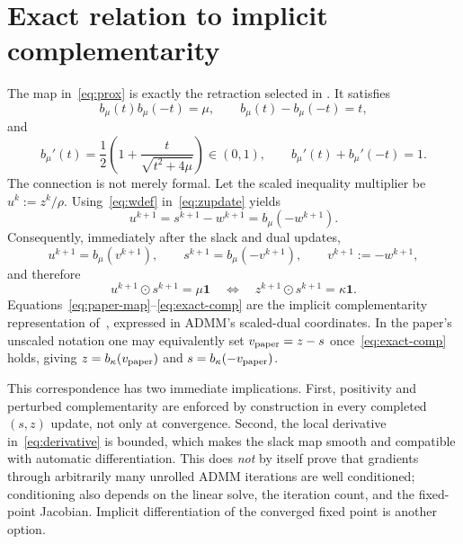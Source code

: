 \documentclass[9pt]{extarticle}
\newcommand{\ones}{\bm{1}}
\newcommand{\had}{\mathbin{\odot}}
\begin{document}
\section{Exact relation to implicit complementarity}

The map in~\eqref{eq:prox} is exactly the retraction selected in
\cite{arrizabalaga2026,arrizabalaga2026implicit}.  It satisfies
\begin{equation}
 b_\mu(t)b_\mu(-t)=\mu,\qquad
 b_\mu(t)-b_\mu(-t)=t,                              \label{eq:identities}
\end{equation}
and
\begin{equation}
 b_\mu'(t)=\frac12\left(1+\frac{t}{\sqrt{t^2+4\mu}}\right)\in(0,1),
 \qquad b_\mu'(t)+b_\mu'(-t)=1.                    \label{eq:derivative}
\end{equation}
The connection is not merely formal.  Let the scaled inequality multiplier be
$u^k:=z^k/\rho$.  Using~\eqref{eq:wdef} in~\eqref{eq:zupdate} yields
\begin{equation}
 u^{k+1}=s^{k+1}-w^{k+1}=b_\mu(-w^{k+1}).           \label{eq:paired}
\end{equation}
Consequently, immediately after the slack and dual updates,
\begin{equation}
 \boxed{
 u^{k+1}=b_\mu(v^{k+1}),\qquad
 s^{k+1}=b_\mu(-v^{k+1}),\qquad
 v^{k+1}:=-w^{k+1},}
 \label{eq:paper-map}
\end{equation}
and therefore
\begin{equation}
 u^{k+1}\had s^{k+1}=\mu\ones
 \quad\Longleftrightarrow\quad
 z^{k+1}\had s^{k+1}=\kappa\ones.                 \label{eq:exact-comp}
\end{equation}
Equations~\eqref{eq:paper-map}--\eqref{eq:exact-comp} are the implicit
complementarity representation of~\cite{arrizabalaga2026,arrizabalaga2026implicit}, expressed in ADMM's
scaled-dual coordinates.  In the paper's unscaled notation one may equivalently set
$v_{\rm paper}=z-s$ once~\eqref{eq:exact-comp} holds, giving
$z=b_\kappa(v_{\rm paper})$ and $s=b_\kappa(-v_{\rm paper})$.

This correspondence has two immediate implications.  First, positivity and perturbed
complementarity are enforced by construction in every completed $(s,z)$ update, not
only at convergence.  Second, the local derivative in~\eqref{eq:derivative} is bounded,
which makes the slack map smooth and compatible with automatic differentiation.  This
does \emph{not} by itself prove that gradients through arbitrarily many unrolled ADMM
iterations are well conditioned; conditioning also depends on the linear solve, the
iteration count, and the fixed-point Jacobian.  Implicit differentiation of the
converged fixed point is another option.
\end{document}
